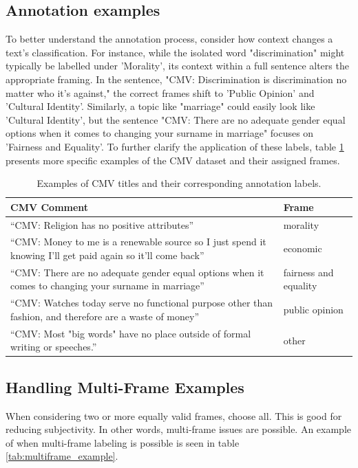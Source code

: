 \documentclass[
10pt, %
a4paper, %
oneside, %
headinclude,footinclude, %
] {book}%
\begin{document}
\subsection{Annotation examples}
To better understand the annotation process, consider how context changes a text's classification. For instance, while the isolated word "discrimination" might typically be labelled under 'Morality', its context within a full sentence alters the appropriate framing. In the sentence, "CMV: Discrimination is discrimination no matter who it's against," the correct frames shift to 'Public Opinion' and 'Cultural Identity'. Similarly, a topic like "marriage" could easily look like 'Cultural Identity', but the sentence "CMV: There are no adequate gender equal options when it comes to changing your surname in marriage" focuses on 'Fairness and Equality'. To further clarify the application of these labels, table \ref{tab:annotation_examples} presents more specific examples of the CMV dataset and their assigned frames.

\begin{table}
\small
    \centering
    \renewcommand{\arraystretch}{1.4}
    \begin{tabular}{|>{\raggedright\arraybackslash}p{9cm}|>{\raggedright\arraybackslash}p{4cm}|}\hline
        \textbf{CMV Comment} & \textbf{Frame} \\\hline
       “CMV: Religion has no positive attributes” & morality\\\hline
        “CMV: Money to me is a renewable source so I just spend it knowing I'll get paid again so it'll come back” & economic\\\hline
        “CMV: There are no adequate gender equal options when it comes to changing your surname in marriage” & fairness and equality\\\hline
        “CMV: Watches today serve no functional purpose other than fashion, and therefore are a waste of money” & public opinion\\\hline
        “CMV: Most "big words" have no place outside of formal writing or speeches.” & other\\ \hline
    \end{tabular}
    \caption{Examples of CMV titles and their corresponding annotation labels.}
    \label{tab:annotation_examples}
\end{table}

\subsection{Handling Multi-Frame Examples}
\label{sec:multi_frame}
When considering two or more equally valid frames, choose all. This is good for reducing subjectivity. In other words, multi-frame issues are possible.  An example of when multi-frame labeling is possible is seen in table \ref{tab:multiframe_example}.
\end{document}
